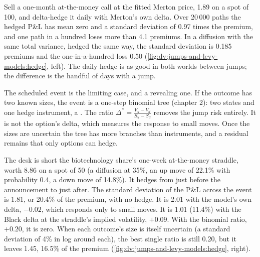 \begin{example}\label{ex:dv:jumps-and-levy-models:hedge}
Sell a one-month at-the-money call at the fitted Merton price, 1.89 on a spot of 100, and delta-hedge it daily
with Merton's own delta. Over 20\,000 paths the hedged P\&L has mean zero and a standard deviation of 0.97 times
the premium, and one path in a hundred loses more than 4.1 premiums. In a diffusion with the same total variance,
hedged the same way, the standard deviation is 0.185 premiums and the one-in-a-hundred loss 0.50
(\cref{fig:dv:jumps-and-levy-models:hedge}, left). The daily hedge is as good in both worlds between jumps; the
difference is the handful of days with a jump.
\end{example}

The scheduled event is the limiting case, and a revealing one. If the outcome has two known sizes, the event is
a one-step binomial tree (chapter 2): two states and one hedge instrument, a . The ratio
$\Delta^*=\frac{V_u-V_d}{S_u-S_d}$ removes the jump risk entirely. It is not the option's delta, which measures
the response to small moves. Once the sizes are uncertain the tree has more branches than instruments, and a
residual remains that only options can hedge.

\begin{example}\label{ex:dv:jumps-and-levy-models:event}
The desk is short the biotechnology share's one-week at-the-money straddle, worth 8.86 on a spot of 50 (a
diffusion at 35\%, an up move of 22.1\% with probability 0.4, a down move of 14.8\%). It hedges from just before
the announcement to just after. The standard deviation of the P\&L across the event is 1.81, or 20.4\% of the
premium, with no hedge. It is 2.01 with the model's own delta, $-0.02$, which responds only to small moves. It is
1.01 (11.4\%) with the Black delta at the straddle's implied volatility, $+0.09$. With the binomial ratio,
$+0.20$, it is zero. When each outcome's size is itself uncertain (a standard deviation of 4\% in log around each),
the best single ratio is still 0.20, but it leaves 1.45, 16.5\% of the premium
(\cref{fig:dv:jumps-and-levy-models:hedge}, right).
\end{example}

